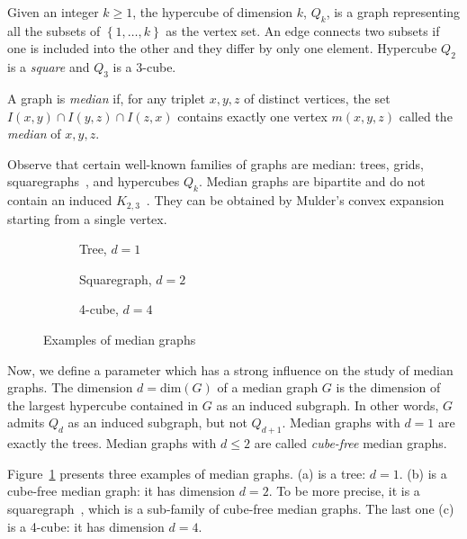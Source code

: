 \documentclass[a4paper,UKenglish,numberwithinsect,cleveref, autoref]{lipics-v2021}
\newcommand{\set}[1]{\left\{ #1 \right\}}
\begin{document}
Given an integer $k \ge 1$, the hypercube of dimension $k$, $Q_k$, is a graph representing all the subsets of $\set{1,\ldots,k}$ as the vertex set. An edge connects two subsets if one is included into the other and they differ by only one element. Hypercube $Q_2$ is a \textit{square} and $Q_3$ is a $3$-cube.

\begin{definition}
A graph is \textit{median} if, for any triplet $x,y,z$ of distinct vertices, the set $I(x,y) \cap I(y,z) \cap I(z,x)$ contains exactly one vertex $m(x,y,z)$ called the \emph{median} of $x,y,z$.
\label{def:median}
\end{definition}

Observe that certain well-known families of graphs are median: trees, grids, squaregraphs~\cite{BaChEp10}, and hypercubes $Q_k$.
Median graphs are bipartite and do not contain an induced $K_{2,3}$~\cite{BaCh08,HaImKl11,Mu78}. They can be obtained by Mulder's convex expansion~\cite{Mu78,Mu80} starting from a single vertex.

\begin{figure}[h]

\begin{subfigure}[b]{0.32\columnwidth}
\centering
\scalebox{0.6}{}
\caption{Tree, $d=1$}
\end{subfigure}
\begin{subfigure}[b]{0.32\columnwidth}
\centering
\scalebox{0.6}{}
\caption{Squaregraph, $d=2$}
\end{subfigure}
\begin{subfigure}[b]{0.32\columnwidth}
\centering
\scalebox{0.6}{}
\caption{4-cube, $d=4$}
\end{subfigure}

\caption{Examples of median graphs}
\label{fig:median_examples}
\end{figure}

Now, we define a parameter which has a strong influence on the study of median graphs.
The dimension $d = \mbox{dim}(G)$ of a median graph $G$ is the dimension of the largest hypercube contained in $G$ as an induced subgraph.
In other words, $G$ admits $Q_d$ as an induced subgraph, but not $Q_{d+1}$. Median graphs with $d=1$ are exactly the trees. Median graphs with $d\le 2$ are called \textit{cube-free} median graphs.

Figure~\ref{fig:median_examples} presents three examples of median graphs. (a) is a tree: $d=1$. (b) is a cube-free median graph: it has dimension $d=2$. To be more precise, it is a squaregraph~\cite{BaChEp10}, which is a sub-family of cube-free median graphs. The last one (c) is a 4-cube: it has dimension $d=4$. 
\end{document}
